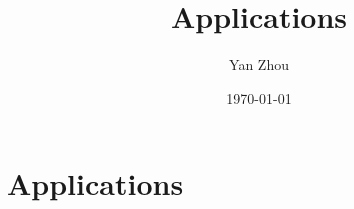\documentclass[11pt, hyper, bib, fontset=Minion]{marticle}
\title{Applications}
\author{Yan Zhou}
\date{\today}
\begin{document}
\maketitle

\else %

\chapter{Applications}
\label{cha:Applications}

\fi %


\ifx\inthesis\undefined
\printbibliography
\end{document}
